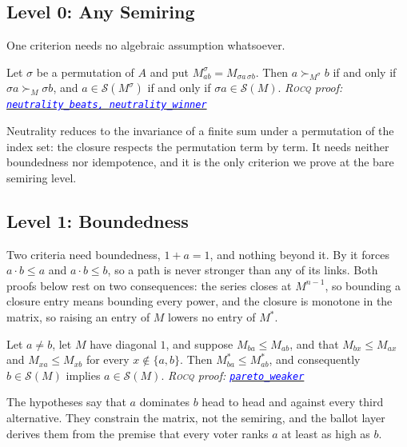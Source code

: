 \documentclass[a4paper,UKenglish,cleveref,autoref,thm-restate,anonymous]{lipics-v2021}
\newcommand{\Mstar}{M^{\ast}}
\newcommand{\rocq}{\textsc{Rocq}}
\newcommand{\anonrepo}{https://anonymous.4open.science/r/Semiring_graph_algorithm-000E}
\newcommand{\rocqfile}[2]{\href{\anonrepo/#1}{\textcolor{blue}{\texttt{#2}}}}
\newcommand{\proofat}[2]{{\footnotesize\itshape\rocq{} proof: \rocqfile{#1}{#2}}}
\begin{document}
\subsection{Level 0: Any Semiring}

One criterion needs no algebraic assumption whatsoever.

\begin{theorem}[Neutrality]\label{thm:neutrality}
Let $\sigma$ be a permutation of $A$ and put
$M^{\sigma}_{ab} = M_{\sigma a\,\sigma b}$. Then $a \succ_{M^{\sigma}} b$ if
and only if $\sigma a \succ_{M} \sigma b$, and $a \in \mathcal{S}(M^{\sigma})$
if and only if $\sigma a \in \mathcal{S}(M)$.
\proofat{algorithm/NeutralityN.v}{neutrality\_beats, neutrality\_winner}
\end{theorem}

Neutrality reduces to the invariance of a finite sum under a permutation
of the index set: the closure respects the permutation term by term. It
needs neither boundedness nor idempotence, and it is the only criterion we
prove at the bare semiring level.

\subsection{Level 1: Boundedness}

Two criteria need boundedness, $1 + a = 1$, and nothing beyond it. By
 it forces $a \cdot b \leq a$ and $a \cdot b \leq b$, so
a path is never stronger than any of its links. Both proofs below rest on
two consequences: the series closes at $M^{n-1}$, so bounding a closure
entry means bounding every power, and the closure is monotone in the
matrix, so raising an entry of $M$ lowers no entry of $\Mstar$.

\begin{theorem}\label{thm:pareto}
Let $a \neq b$, let $M$ have diagonal $1$, and suppose
$M_{ba} \leq M_{ab}$, and that
$M_{bx} \leq M_{ax}$ and $M_{xa} \leq M_{xb}$ for every
$x \notin \{a,b\}$. Then $\Mstar_{ba} \leq \Mstar_{ab}$, and consequently
$b \in \mathcal{S}(M)$ implies $a \in \mathcal{S}(M)$.
\proofat{algorithm/ParetoN.v}{pareto\_weaker}
\end{theorem}

The hypotheses say that $a$ dominates $b$ head to head and against every
third alternative. They constrain the matrix, not the semiring, and the
ballot layer derives them from the premise that every voter ranks $a$ at
least as high as $b$.
\end{document}
